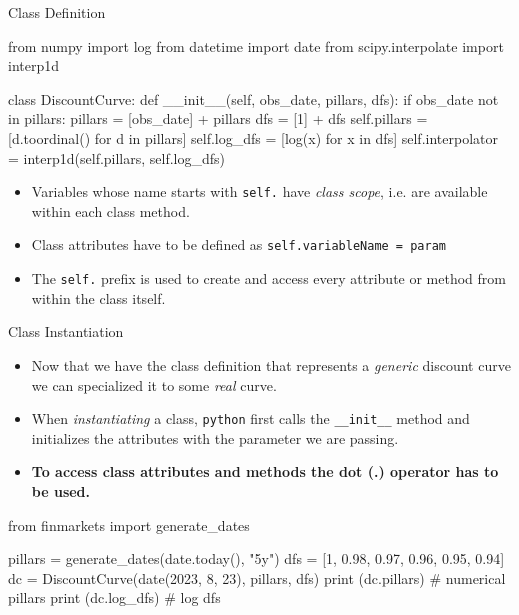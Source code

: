 \documentclass{beamer}
\begin{document}
\begin{frame}[fragile]{Class Definition}
\begin{ipython}
from numpy import log
from datetime import date
from scipy.interpolate import interp1d  
	
class DiscountCurve:
    def __init__(self, obs_date, pillars, dfs):
        if obs_date not in pillars:
            pillars = [obs_date] + pillars
            dfs = [1] + dfs
        self.pillars = [d.toordinal() for d in pillars]
        self.log_dfs = [log(x) for x in dfs]
        self.interpolator = interp1d(self.pillars, self.log_dfs)
\end{ipython}
\begin{itemize}
\item Variables whose name starts with \texttt{self.} have \emph{class scope}, i.e. are available within each class method.
\item Class attributes have to be defined as \texttt{self.variableName = param}
\item The \texttt{self.} prefix is used to create and access every attribute or method from within the class itself.
\end{itemize}
\end{frame}

\begin{frame}[fragile]{Class Instantiation}
  \begin{itemize}
  \item Now that we have the class definition that represents a \emph{generic} discount curve we can specialized it to some \emph{real} curve.
  \item When \emph{instantiating} a class, \texttt{python} first calls the \texttt{\_\_init\_\_} method and initializes the attributes with the parameter we are passing.
  \item \textbf{To access class attributes and methods the dot (.) operator has to be used.}
  \end{itemize}
\begin{ipython}
from finmarkets import generate_dates
			
pillars = generate_dates(date.today(), "5y")
dfs = [1, 0.98, 0.97, 0.96, 0.95, 0.94]      
dc = DiscountCurve(date(2023, 8, 23), pillars, dfs)
print (dc.pillars) # numerical pillars
print (dc.log_dfs) # log dfs
\end{ipython}
\begin{ioutput}
[738755 738761 739127 739492 739857 740222 740588]
[ 0.          0.         -0.02020271 -0.03045921 -0.04082199 -0.05129329
 -0.0618754 ]
\end{ioutput}
\end{frame}
\end{document}
